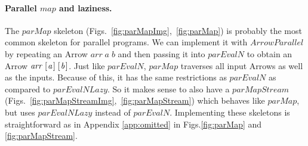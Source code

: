 \documentclass{jfp1}
\newcommand{\Conid}[1]{\mathit{#1}}
\newcommand{\Varid}[1]{\mathit{#1}}
\begin{document}
\paragraph{Parallel \ensuremath{\Varid{map}} and laziness.}
The \ensuremath{\Varid{parMap}} skeleton (Figs.~\ref{fig:parMapImg},~\ref{fig:parMap}) is probably the most common skeleton for parallel programs. We can implement it with \ensuremath{\Conid{ArrowParallel}} by repeating an Arrow \ensuremath{\Varid{arr}\;\Varid{a}\;\Varid{b}} and then passing it into \ensuremath{\Varid{parEvalN}} to obtain an Arrow \ensuremath{\Varid{arr}\;[\mskip1.5mu \Varid{a}\mskip1.5mu]\;[\mskip1.5mu \Varid{b}\mskip1.5mu]}.
Just like \ensuremath{\Varid{parEvalN}}, \ensuremath{\Varid{parMap}} traverses all input Arrows as well as the inputs.
Because of this, it has the same restrictions as \ensuremath{\Varid{parEvalN}} as compared to \ensuremath{\Varid{parEvalNLazy}}. So it makes sense to also have a \ensuremath{\Varid{parMapStream}} (Figs.~\ref{fig:parMapStreamImg},~\ref{fig:parMapStream}) which behaves like \ensuremath{\Varid{parMap}}, but uses \ensuremath{\Varid{parEvalNLazy}} instead of \ensuremath{\Varid{parEvalN}}. Implementing these skeletons is straightforward as in Appendix \ref{app:omitted} in Figs.\ref{fig:parMap} and \ref{fig:parMapStream}.
\end{document}
